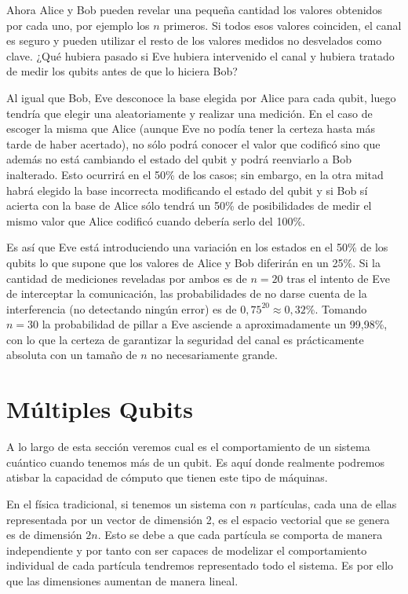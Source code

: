 Ahora Alice y Bob pueden revelar una pequeña cantidad los valores obtenidos por cada uno, por ejemplo los $n$ primeros. Si todos esos valores coinciden, el canal es seguro y pueden utilizar el resto de los valores medidos no desvelados como clave. ¿Qué hubiera pasado si Eve hubiera intervenido el canal y hubiera tratado de medir los qubits antes de que lo hiciera Bob?

Al igual que Bob, Eve desconoce la base elegida por Alice para cada qubit, luego tendría que elegir una aleatoriamente  y realizar una medición. En el caso de escoger la misma que Alice (aunque Eve no podía tener la certeza hasta más tarde de haber acertado), no sólo podrá conocer el valor que codificó sino que además no está cambiando el estado del qubit y podrá reenviarlo a Bob inalterado. Esto ocurrirá en el 50\% de los casos; sin embargo, en la otra mitad habrá elegido la base incorrecta modificando el estado del qubit y si Bob sí acierta con la base de Alice sólo tendrá un 50\% de posibilidades de medir el mismo valor que Alice codificó cuando debería serlo del 100\%.

Es así que Eve está introduciendo una variación en los estados en el 50\% de los qubits lo que supone que los valores de Alice y Bob diferirán en un 25\%. Si la cantidad de mediciones reveladas por ambos es de $n=20$ tras el intento de Eve de interceptar la comunicación, las probabilidades de no darse cuenta de la interferencia (no detectando ningún error) es de $0,75^{20}\approx0,32\%$. Tomando $n=30$ la probabilidad de pillar a Eve asciende a aproximadamente un 99,98\%, con lo que la certeza de garantizar la seguridad del canal es prácticamente absoluta con un tamaño de $n$ no necesariamente grande.

\section{Múltiples Qubits}

A lo largo de esta sección veremos cual es el comportamiento de un sistema cuántico cuando tenemos más de un qubit. Es aquí donde realmente podremos atisbar la capacidad de cómputo que tienen este tipo de máquinas.

En el física tradicional, si tenemos un sistema con $n$ partículas, cada una de ellas representada por un vector de dimensión 2, es el espacio vectorial que se genera es de dimensión $2n$. Esto se debe a que cada partícula se comporta de manera independiente y por tanto con ser capaces de modelizar el comportamiento individual de cada partícula tendremos representado todo el sistema. Es por ello que las dimensiones aumentan de manera lineal.

